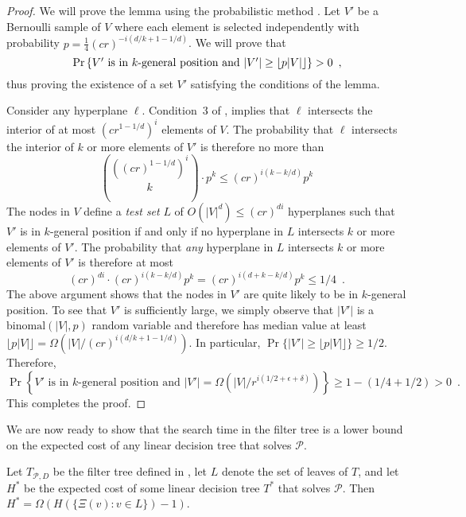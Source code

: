 \documentclass{patmorin}
\begin{document}
\begin{proof}
  We will prove the lemma using the probabilistic method \cite{as08}.
  Let $V'$ be a Bernoulli sample of $V$ where each element is selected
  independently with probability $p=\frac{1}{4}(cr)^{-i(d/k+1-1/d)}$. We
  will prove that
  \[
     \Pr\left\{
        \mbox{$V'$ is in $k$-general position 
          and $|V'| \ge {\left\lfloor p|V| \right\rfloor}$}
      \right\} > 0 \enspace ,
  \]
  thus proving the existence of a set $V'$ satisfying the conditions of
  the lemma.

  Consider any hyperplane $\ell$. Condition~3 of
  , implies that $\ell$ intersects the
  interior of at most $(cr^{1-1/d})^{i}$ elements of $V$.
  The probability that $\ell$ intersects the interior of $k$ or more
  elements of $V'$ is therefore no more than
  \[
    \binom{((cr)^{1-1/d})^{i}}{k}\cdot p^k
    \le (cr)^{i(k-k/d)}p^k
  \]
  The nodes in $V$ define a \emph{test set} $L$ of $O(|V|^d)\le (cr)^{di}$
  hyperplanes such that $V'$ is in $k$-general position if and only
  if no hyperplane in $L$ intersects $k$ or more elements of $V'$. The
  probability that \emph{any} hyperplane in $L$ intersects $k$ or more
  elements of $V'$ is therefore at most
  \[
    (cr)^{di}\cdot(cr)^{i(k-k/d)}p^k = (cr)^{i(d+k-k/d)}p^k \le 1/4 \enspace .
  \]
  The above argument shows that the nodes in $V'$ are quite likely to
  be in $k$-general position. To see that $V'$ is sufficiently large,
  we simply observe that $|V'|$ is a $\mathrm{binomal}(|V|,p)$
  random variable and therefore has median value at least
  $\lfloor{p|V|}\rfloor=\Omega(|V|/(cr)^{i(d/k+1-1/d)})$.  In particular,
  $\Pr\{|V'|\ge \lfloor{p|V|}\rfloor\}\ge 1/2$.  Therefore,
  \[
     \Pr\left\{
        \mbox{$V'$ is in $k$-general position 
          and $|V'|=\Omega(|V|/r^{i(1/2+\epsilon+\delta)})$}
      \right\} \ge 1- (1/4 + 1/2) > 0 \enspace .
  \]
  This completes the proof.
\end{proof}

We are now ready to show that the search time in the filter tree
is a lower bound on the expected cost of any linear decision tree that
solves $\mathcal{P}$.

\begin{lem}
  Let $T_{\mathcal{P},D}$ be the filter tree defined in
  , let $L$ denote the set of leaves of $T$,
  and let $H^*$ be the expected cost of some linear decision tree $T^*$
  that solves $\mathcal{P}$.  Then $H^* = \Omega(H(\{\Xi(v):v\in L\})-1)$.
\end{lem}
\end{document}
